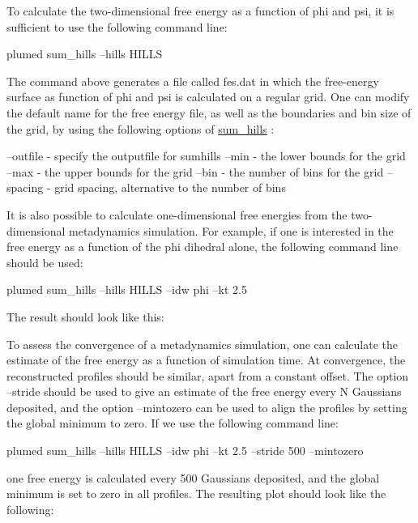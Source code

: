 To calculate the two-\/dimensional free energy as a function of phi and psi, it is sufficient to use the following command line\+:

\begin{DoxyVerb}plumed sum_hills --hills HILLS
\end{DoxyVerb}


The command above generates a file called fes.\+dat in which the free-\/energy surface as function of phi and psi is calculated on a regular grid. One can modify the default name for the free energy file, as well as the boundaries and bin size of the grid, by using the following options of \hyperlink{sum_hills}{sum\+\_\+hills} \+:

\begin{DoxyVerb}--outfile - specify the outputfile for sumhills
--min - the lower bounds for the grid
--max - the upper bounds for the grid
--bin - the number of bins for the grid
--spacing - grid spacing, alternative to the number of bins
\end{DoxyVerb}


It is also possible to calculate one-\/dimensional free energies from the two-\/dimensional metadynamics simulation. For example, if one is interested in the free energy as a function of the phi dihedral alone, the following command line should be used\+:

\begin{DoxyVerb}plumed sum_hills --hills HILLS --idw phi --kt 2.5
\end{DoxyVerb}


The result should look like this\+:

\label{belfast-6_belfast-6-phifes-fig}%
\hypertarget{belfast-6_belfast-6-phifes-fig}{}%
 To assess the convergence of a metadynamics simulation, one can calculate the estimate of the free energy as a function of simulation time. At convergence, the reconstructed profiles should be similar, apart from a constant offset. The option --stride should be used to give an estimate of the free energy every N Gaussians deposited, and the option --mintozero can be used to align the profiles by setting the global minimum to zero. If we use the following command line\+:

\begin{DoxyVerb}plumed sum_hills --hills HILLS --idw phi --kt 2.5 --stride 500 --mintozero
\end{DoxyVerb}


one free energy is calculated every 500 Gaussians deposited, and the global minimum is set to zero in all profiles. The resulting plot should look like the following\+:

